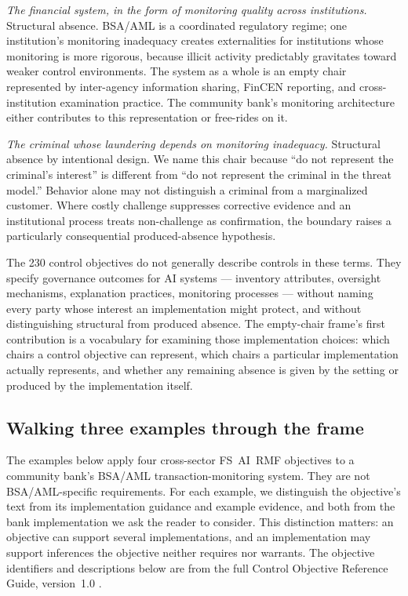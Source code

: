\emph{The financial system, in the form of monitoring quality across institutions.} Structural absence. BSA/AML is a coordinated regulatory regime; one institution's monitoring inadequacy creates externalities for institutions whose monitoring is more rigorous, because illicit activity predictably gravitates toward weaker control environments. The system as a whole is an empty chair represented by inter-agency information sharing, FinCEN reporting, and cross-institution examination practice. The community bank's monitoring architecture either contributes to this representation or free-rides on it.

\emph{The criminal whose laundering depends on monitoring inadequacy.} Structural absence by intentional design. We name this chair because ``do not represent the criminal's interest'' is different from ``do not represent the criminal in the threat model.'' Behavior alone may not distinguish a criminal from a marginalized customer. Where costly challenge suppresses corrective evidence and an institutional process treats non-challenge as confirmation, the boundary raises a particularly consequential produced-absence hypothesis.

The 230 control objectives do not generally describe controls in these terms. They specify governance outcomes for AI systems --- inventory attributes, oversight mechanisms, explanation practices, monitoring processes --- without naming every party whose interest an implementation might protect, and without distinguishing structural from produced absence. The empty-chair frame's first contribution is a vocabulary for examining those implementation choices: which chairs a control objective can represent, which chairs a particular implementation actually represents, and whether any remaining absence is given by the setting or produced by the implementation itself.

\subsection{Walking three examples through the frame}
\label{sec:frame-as-method:walking-three-controls}

The examples below apply four cross-sector FS~AI~RMF objectives to a community bank's BSA/AML transaction-monitoring system. They are not BSA/AML-specific requirements. For each example, we distinguish the objective's text from its implementation guidance and example evidence, and both from the bank implementation we ask the reader to consider. This distinction matters: an objective can support several implementations, and an implementation may support inferences the objective neither requires nor warrants. The objective identifiers and descriptions below are from the full Control Objective Reference Guide, version~1.0 \parencite{fssccFSAIRMF2026}.

